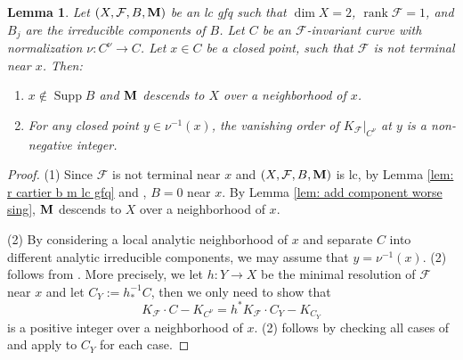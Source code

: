 \documentclass[11pt]{amsart}
\numberwithin{equation}{section}
\newcommand{\Mm}{{\bf{M}}}
\newcommand{\rk}{\operatorname{rank}}
\newcommand{\Supp}{\operatorname{Supp}}
\newcommand{\Ff}{\mathcal{F}}
\newtheorem{lem}[thm]{Lemma}
\theoremstyle{definition}
\theoremstyle{definition}
\theoremstyle{definition}
\begin{document}
\begin{lem}\label{lem: surface pia not terminal}
     Let $(X,\Ff,B,\Mm)$ be an lc gfq such that $\dim X=2$, $\rk\Ff=1$, and $B_j$ are the irreducible components of $B$. Let $C$ be an $\Ff$-invariant curve with normalization $\nu: C^\nu\rightarrow C$. Let $x\in C$ be a closed point, such that $\Ff$ is not terminal near $x$. Then:
     \begin{enumerate}
         \item $x\not\in\Supp B$ and $\Mm$ descends to $X$ over a neighborhood of $x$.
         \item For any closed point $y\in\nu^{-1}(x)$, the vanishing order of $K_{\Ff}|_{C^\nu}$ at $y$ is a non-negative integer.
     \end{enumerate}
\end{lem}
\begin{proof}
  (1) Since $\Ff$ is not terminal near $x$ and $(X,\Ff,B,\Mm)$ is lc, by Lemma \ref{lem: r cartier b m lc gfq} and \cite[Theorem 3.19]{LMX23a}, $B=0$ near $x$. By Lemma \ref{lem: add component worse sing}, $\Mm$ descends to $X$ over a neighborhood of $x$. 

  (2) By considering a local analytic neighborhood of $x$ and separate $C$ into different analytic irreducible components, we may assume that $y=\nu^{-1}(x)$. (2) follows from \cite[Theorem 3.19]{LMX23a}. More precisely, we let $h: Y\rightarrow X$ be the minimal resolution of $\Ff$ near $x$ and let $C_Y:=h^{-1}_*C$, then we only need to show that
  $$K_{\Ff}\cdot C-K_{C^\nu}=h^*K_{\Ff}\cdot C_Y-K_{C_Y}$$
  is a positive integer over a neighborhood of $x$. (2) follows by checking all cases of \cite[Theorem 3.19]{LMX23a} and apply \cite[Proposition 2.16(3)]{CS20} to $C_Y$ for each case.
\end{proof}
\end{document}
